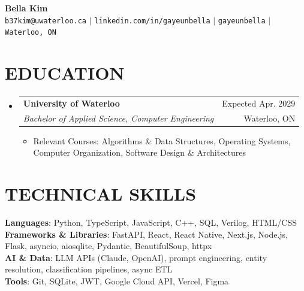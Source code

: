 \documentclass[letterpaper,11pt]{article}
\makeatletter
\newcommand{\resumeItem}[1]{
  \item\small{
    {#1 \vspace{-1pt}}
  }
}
\newcommand{\resumeSubheading}[4]{
  \vspace{-1pt}\item
    \begin{tabular*}{\textwidth}[t]{l@{\extracolsep{\fill}}r}
      \textbf{#1} & {\color{dark-grey}\small #2}\vspace{1pt}\\
      \textit{#3} & {\color{dark-grey} \small #4}\\
    \end{tabular*}\vspace{-4pt}
}
\newcommand{\resumeSubHeadingListStart}{\begin{itemize}[leftmargin=0in, label={}]}
\newcommand{\resumeSubHeadingListEnd}{\end{itemize}}
\newcommand{\resumeItemListStart}{\begin{itemize}[itemsep=2.5pt, parsep=0pt]}
\newcommand{\resumeItemListEnd}{\end{itemize}\vspace{0pt}}
\makeatother
\begin{document}
\begin{center}
    \textbf{\Huge Bella Kim} \\ \vspace{6pt}
    \small
    \faEnvelope \hspace{2pt} \texttt{b37kim@uwaterloo.ca} \hspace{1pt} $|$
    \hspace{1pt} \faLinkedin \hspace{2pt} \texttt{linkedin.com/in/gayeunbella} \hspace{1pt} $|$
    \hspace{1pt} \faGithub \hspace{2pt} \texttt{gayeunbella} \hspace{1pt} $|$
    \hspace{1pt} \faMapMarker* \hspace{2pt} \texttt{Waterloo, ON}
    \\ \vspace{-4pt}
\end{center}

\section{EDUCATION}
  \resumeSubHeadingListStart
    \resumeSubheading
      {University of Waterloo}{Expected Apr. 2029}
      {Bachelor of Applied Science, Computer Engineering}{Waterloo, ON}
      \resumeItemListStart
        \resumeItem{Relevant Courses: Algorithms \& Data Structures, Operating Systems, Computer Organization, Software Design \& Architectures}
      \resumeItemListEnd
  \resumeSubHeadingListEnd

\section{TECHNICAL SKILLS}
  \begin{itemize}[leftmargin=0in, label={}]
    \small{\item{
      \textbf{Languages}{: Python, TypeScript, JavaScript, C++, SQL, Verilog, HTML/CSS} \\
      \textbf{Frameworks \& Libraries}{: FastAPI, React, React Native, Next.js, Node.js, Flask, asyncio, aiosqlite, Pydantic, BeautifulSoup, httpx} \\
      \textbf{AI \& Data}{: LLM APIs (Claude, OpenAI), prompt engineering, entity resolution, classification pipelines, async ETL} \\
      \textbf{Tools}{: Git, SQLite, JWT, Google Cloud API, Vercel, Figma}
    }}
  \end{itemize}
\end{document}
